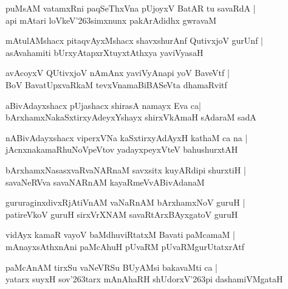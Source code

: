 \documentclass[twoside,12pt,openright]{book}
\def\S{\char'263}
\newcounter{shloka}[chapter]
\begin{document}
\begin{shloka}
puMsAM vatamxRni paqSeThxVna pUjoyxV BatAR tu savaRdA |\\
api mAtari loVkeV\S simxnunx pakArAdidhx gwravaM 
\end{shloka}

\begin{shloka}
mAtulAMshacx pitaqvAyxMshacx shavxshurAnf QutivxjoV gurUnf |\\
asAvahamiti bUrxyAtapxrXtuyxtAthxya yaviVyasaH 
\end{shloka}

\begin{shloka}
avAcoyxV QUtivxjoV nAmAnx yaviVyAnapi yoV BaveVtf |\\
BoV BavatUpxvaRkaM tevxVnamaBiBASeVta dhamaRvitf 
\end{shloka}

\begin{shloka}
aBivAdayxshacx pUjashacx shirasA namayx Eva ca|\\
bArxhamxNakaSxtirxyAdeyxYshayx shirxVkAmaH sAdaraM sadA
\end{shloka}

\begin{shloka}
nABivAdayxshacx viperxVNa kaSxtirxyAdAyxH kathaM ca na |\\
jAcnxnakamaRhuNoVpeVtov yadayxpeyxVteV bahushurxtAH 
\end{shloka}

\begin{shloka}
bArxhamxNasasxvaRvaNARnaM savxsitx kuyARdipi shurxtiH |\\
savaNeRVva savaNARnAM kayaRmeVvABivAdanaM 
\end{shloka}

\begin{shloka}
gururaginxdivxRjAtiVnAM vaNaRnAM bArxhamxNoV guruH |\\
patireVkoV guruH sirxVrXNAM savaRtArxBAyxgatoV guruH 
\end{shloka}

\begin{shloka}
vidAyx kamaR vayoV baMdhuviRtatxM Bavati paMcamaM |\\
mAnayxsAthxnAni paMcAhuH pUvaRM pUvaRMgurUtatxrAtf
\end{shloka}

\begin{shloka}
paMcAnAM tirxSu vaNeVRSu BUyAMsi bakavaMti ca |\\
yatarx suyxH sov\S tarx mAnAhaRH shUdorxV\S pi dashamiVMgataH
\end{shloka}
\end{document}
